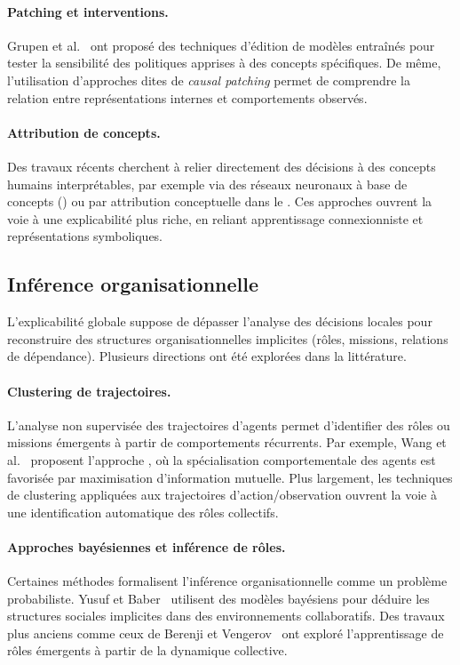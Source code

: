 \paragraph{Patching et interventions.}
Grupen et al.~\cite{grupen2022concept} ont proposé des techniques
d'édition de modèles entraînés pour tester la sensibilité
des politiques apprises à des concepts spécifiques.
De même, l'utilisation d'approches dites de \textit{causal patching}
\cite{geiger2021causal} permet de comprendre la relation entre
représentations internes et comportements observés.

\paragraph{Attribution de concepts.}
Des travaux récents cherchent à relier directement des décisions
à des concepts humains interprétables,
par exemple via des réseaux neuronaux à base de concepts ()
\cite{kim2018interpretability}
ou par attribution conceptuelle dans le 
\cite{zabounidis2023concept}.
Ces approches ouvrent la voie à une explicabilité plus riche,
en reliant apprentissage connexionniste et représentations symboliques.

\subsection{Inférence organisationnelle}

\noindent
L'explicabilité globale suppose de dépasser l'analyse des décisions locales
pour reconstruire des structures organisationnelles implicites
(rôles, missions, relations de dépendance).
Plusieurs directions ont été explorées dans la littérature.

\paragraph{Clustering de trajectoires.}
L'analyse non supervisée des trajectoires d'agents permet d'identifier
des rôles ou missions émergents à partir de comportements récurrents.
Par exemple, Wang et al.~\cite{Wang2020} proposent l'approche , où la spécialisation comportementale
des agents est favorisée par maximisation d'information mutuelle.
Plus largement, les techniques de clustering appliquées aux trajectoires
d'action/observation ouvrent la voie à une identification
automatique des rôles collectifs.

\paragraph{Approches bayésiennes et inférence de rôles.}
Certaines méthodes formalisent l'inférence organisationnelle
comme un problème probabiliste.
Yusuf et Baber~\cite{yusuf2020inferential} utilisent des modèles bayésiens
pour déduire les structures sociales implicites dans des environnements collaboratifs.
Des travaux plus anciens comme ceux de Berenji et Vengerov~\cite{berenji2000learning}
ont exploré l'apprentissage de rôles émergents à partir de la dynamique collective.

